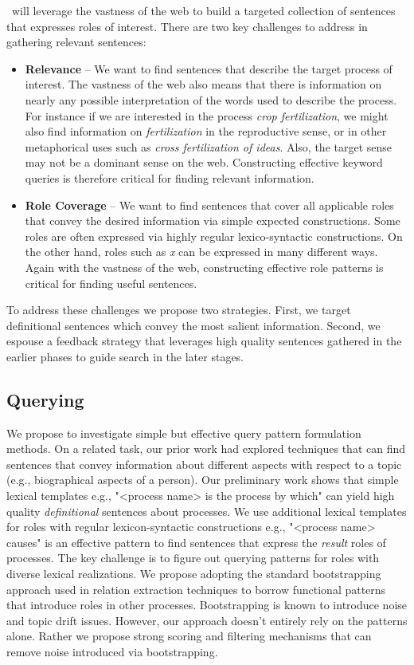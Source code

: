\sys\ will leverage the vastness of the web to build a targeted collection of sentences that expresses roles of interest.
There are two key challenges to address in gathering relevant sentences:
\begin{itemize}
\item {\bf Relevance} -- We want to find sentences that describe the target process of interest. 
The vastness of the web also means that there is information on nearly any possible interpretation of the words used to describe the process. 
For instance if we are interested in the process {\em crop fertilization}, we might also find information on {\em fertilization} in the reproductive sense, 
or in other metaphorical uses such as {\em cross fertilization of ideas}. 
Also, the target sense may not be a dominant sense on the web. 
Constructing effective keyword queries is therefore critical for finding relevant information.
\item {\bf Role Coverage} -- We want to find sentences that cover all applicable roles that convey the desired information via simple expected constructions.
Some roles are often expressed via highly regular lexico-syntactic constructions. 
On the other hand, roles such as {\em x} can be expressed in many different ways. 
Again with the vastness of the web, constructing effective role patterns is critical for finding useful sentences. 
\end{itemize}

To address these challenges we propose two strategies. First, we target definitional sentences which convey the most salient information. Second, we espouse a feedback strategy that leverages high quality sentences gathered in the earlier phases to guide search in the later stages.

\subsection{Querying}

We propose to investigate simple but effective query pattern formulation methods. 
On a related task, our prior work had explored techniques that can find sentences that convey information about different aspects with respect to a topic (e.g., biographical aspects of a person). 
Our preliminary work shows that simple lexical templates e.g., "<process name> is the process by which" can yield high quality {\em definitional} sentences about processes. 
We use additional lexical templates for roles with regular lexicon-syntactic constructions e.g., "<process name> causes" is an effective pattern to find sentences that express the {\em result} roles of processes. The key challenge is to figure out querying patterns for roles with diverse lexical realizations. We propose adopting the standard bootstrapping approach used in relation extraction techniques to borrow functional patterns that introduce roles in other processes. Bootstrapping is known to introduce noise and topic drift issues. However, our approach doesn't entirely rely on the patterns alone. Rather we propose strong scoring and filtering mechanisms that can remove noise introduced via bootstrapping.


